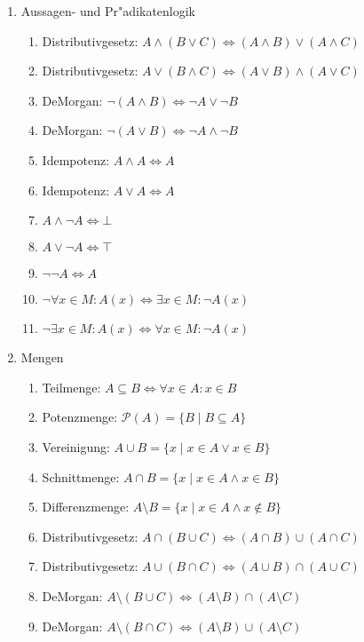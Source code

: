 \begin{enumerate}
\item Aussagen- und Pr"adikatenlogik
\begin{enumerate}
    \item Distributivgesetz: $A\wedge (B \vee C) \Leftrightarrow (A\wedge B) \vee (A\wedge C)$
    \item Distributivgesetz: $A\vee (B \wedge C) \Leftrightarrow (A\vee B) \wedge (A\vee C)$
    \item DeMorgan: $\neg(A\wedge B) \Leftrightarrow \neg A \vee \neg B$
    \item DeMorgan: $\neg(A\vee B) \Leftrightarrow \neg A \wedge \neg B$
    \item Idempotenz: $A\wedge A \Leftrightarrow A$
    \item Idempotenz: $A\vee A \Leftrightarrow A$
    \item $A\wedge \neg A \Leftrightarrow \bot$
    \item $A\vee \neg A \Leftrightarrow \top$
    \item $\neg\neg A \Leftrightarrow A$
    \item $\neg\forall x\in M: A(x) \Leftrightarrow \exists x\in M: \neg A(x)$
    \item $\neg\exists x\in M: A(x) \Leftrightarrow \forall x\in M: \neg A(x)$
\end{enumerate}
\item Mengen
\begin{enumerate}
    \item Teilmenge: $A\subseteq B \Leftrightarrow \forall x\in A: x\in B$
    \item Potenzmenge: $\mathscr{P}(A) = \{B\mid B\subseteq A\}$
    \item Vereinigung: $A\cup B = \{x\mid x\in A \vee x\in B\}$
    \item Schnittmenge: $A\cap B = \{x\mid x\in A \wedge x\in B\}$
    \item Differenzmenge: $A\setminus B = \{x\mid x\in A \wedge x\notin B\}$
    \item Distributivgesetz: $A\cap (B \cup C) \Leftrightarrow (A\cap B) \cup (A\cap C)$
    \item Distributivgesetz: $A\cup (B \cap C) \Leftrightarrow (A\cup B) \cap (A\cup C)$
    \item DeMorgan: $A\setminus (B\cup C) \Leftrightarrow (A\setminus B) \cap (A\setminus C)$
    \item DeMorgan: $A\setminus (B\cap C) \Leftrightarrow (A\setminus B) \cup (A\setminus C)$

\end{enumerate}
\end{enumerate}
